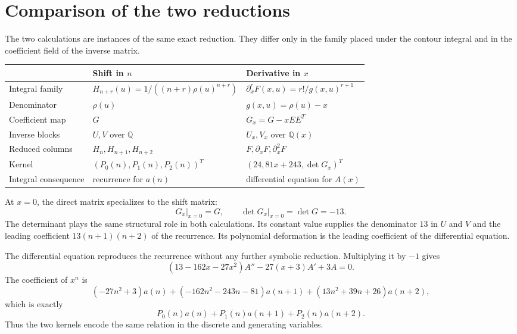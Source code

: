 \documentclass[11pt,fleqn]{article}
\theoremstyle{plain}
\begin{document}
\section{Comparison of the two reductions}

The two calculations are instances of the same exact reduction.  They differ
only in the family placed under the contour integral and in the coefficient
field of the inverse matrix.

\begin{center}
\renewcommand{\arraystretch}{1.22}
\begin{tabularx}{\textwidth}{>{\raggedright\arraybackslash}p{}
                              >{\raggedright\arraybackslash}X
                              >{\raggedright\arraybackslash}X}
\toprule
& \textbf{Shift in $n$} & \textbf{Derivative in $x$}\\
\midrule
Integral family
& $H_{n+r}(u)=1/((n+r)\rho(u)^{n+r})$
& $\partial_x^rF(x,u)=r!/g(x,u)^{r+1}$\\
Denominator
& $\rho(u)$
& $g(x,u)=\rho(u)-x$\\
Coefficient map
& $G$
& $G_x=G-xEE^T$\\
Inverse blocks
& $U,V$ over $\mathbb Q$
& $U_x,V_x$ over $\mathbb Q(x)$\\
Reduced columns
& $H_n,H_{n+1},H_{n+2}$
& $F,\partial_xF,\partial_x^2F$\\
Kernel
& $(P_0(n),P_1(n),P_2(n))^T$
& $(24,81x+243,\det G_x)^T$\\
Integral consequence
& recurrence for $a(n)$
& differential equation for $A(x)$\\
\bottomrule
\end{tabularx}
\end{center}

At $x=0$, the direct matrix specializes to the shift matrix:
\[
G_x\big|_{x=0}=G,
\qquad
\det G_x\big|_{x=0}=\det G=-13.
\]
The determinant plays the same structural role in both calculations.  Its
constant value supplies the denominator $13$ in $U$ and $V$ and the leading
coefficient $13(n+1)(n+2)$ of the recurrence.  Its polynomial deformation is
the leading coefficient of the differential equation.

The differential equation reproduces the recurrence without any further
symbolic reduction.  Multiplying it by $-1$ gives
\[
(13-162x-27x^2)A''-27(x+3)A'+3A=0.
\]
The coefficient of $x^n$ is
\[
(-27n^2+3)a(n)+(-162n^2-243n-81)a(n+1)
 +(13n^2+39n+26)a(n+2),
\]
which is exactly
\[
P_0(n)a(n)+P_1(n)a(n+1)+P_2(n)a(n+2).
\]
Thus the two kernels encode the same relation in the discrete and generating
variables.
\end{document}
